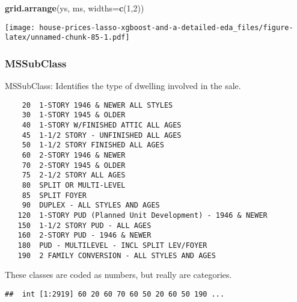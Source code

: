 \documentclass[]{article}
\newenvironment{Shaded}{\begin{snugshade}}{\end{snugshade}}
\newcommand{\KeywordTok}[1]{\textcolor[rgb]{0.13,0.29,0.53}{\textbf{#1}}}
\newcommand{\DataTypeTok}[1]{\textcolor[rgb]{0.13,0.29,0.53}{#1}}
\newcommand{\DecValTok}[1]{\textcolor[rgb]{0.00,0.00,0.81}{#1}}
\newcommand{\OperatorTok}[1]{\textcolor[rgb]{0.81,0.36,0.00}{\textbf{#1}}}
\newcommand{\NormalTok}[1]{#1}
\begin{document}
\begin{Shaded}
\begin{Highlighting}[]
\KeywordTok{grid.arrange}\NormalTok{(ys, ms, }\DataTypeTok{widths=}\KeywordTok{c}\NormalTok{(}\DecValTok{1}\NormalTok{,}\DecValTok{2}\NormalTok{))}
\end{Highlighting}
\end{Shaded}

\texttt{[image: house-prices-lasso-xgboost-and-a-detailed-eda\_files/figure-latex/unnamed-chunk-85-1.pdf]}

\subsubsection{MSSubClass}\label{mssubclass}

MSSubClass: Identifies the type of dwelling involved in the sale.

\begin{verbatim}
    20  1-STORY 1946 & NEWER ALL STYLES
    30  1-STORY 1945 & OLDER
    40  1-STORY W/FINISHED ATTIC ALL AGES
    45  1-1/2 STORY - UNFINISHED ALL AGES
    50  1-1/2 STORY FINISHED ALL AGES
    60  2-STORY 1946 & NEWER
    70  2-STORY 1945 & OLDER
    75  2-1/2 STORY ALL AGES
    80  SPLIT OR MULTI-LEVEL
    85  SPLIT FOYER
    90  DUPLEX - ALL STYLES AND AGES
   120  1-STORY PUD (Planned Unit Development) - 1946 & NEWER
   150  1-1/2 STORY PUD - ALL AGES
   160  2-STORY PUD - 1946 & NEWER
   180  PUD - MULTILEVEL - INCL SPLIT LEV/FOYER
   190  2 FAMILY CONVERSION - ALL STYLES AND AGES
\end{verbatim}

These classes are coded as numbers, but really are categories.

\begin{Shaded}
\end{Shaded}

\begin{verbatim}
##  int [1:2919] 60 20 60 70 60 50 20 60 50 190 ...
\end{verbatim}
\end{document}
